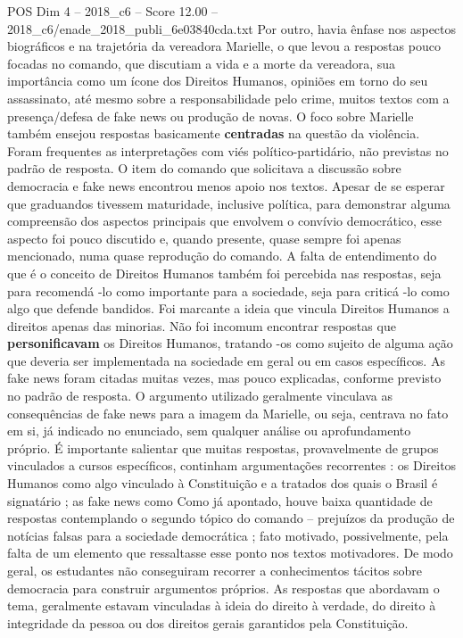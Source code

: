 \begin{textsample}{POS Dim 4 – 2018\_c6 – Score 12.00 – 2018\_c6/enade\_2018\_publi\_6e03840cda.txt}
Por outro, havia ênfase nos aspectos biográficos e na trajetória da vereadora Marielle, o que levou a respostas pouco focadas no comando, que discutiam a vida e a morte da vereadora, sua importância como um ícone dos Direitos Humanos, opiniões em torno do seu assassinato, até mesmo sobre a responsabilidade pelo crime, muitos textos com a presença/defesa de fake news ou produção de novas.
O foco sobre Marielle também ensejou respostas basicamente \textbf{centradas} na questão da violência.
Foram frequentes as interpretações com viés político-partidário, não previstas no padrão de resposta.
O item do comando que solicitava a discussão sobre democracia e fake news encontrou menos apoio nos textos.
Apesar de se esperar que graduandos tivessem maturidade, inclusive política, para demonstrar alguma compreensão dos aspectos principais que envolvem o convívio democrático, esse aspecto foi pouco discutido e, quando presente, quase sempre foi apenas mencionado, numa quase reprodução do comando.
A falta de entendimento do que é o conceito de Direitos Humanos também foi percebida nas respostas, seja para recomendá -lo como importante para a sociedade, seja para criticá -lo como algo que defende bandidos.
Foi marcante a ideia que vincula Direitos Humanos a direitos apenas das minorias.
Não foi incomum encontrar respostas que \textbf{personificavam} os Direitos Humanos, tratando -os como sujeito de alguma ação que deveria ser implementada na sociedade em geral ou em casos específicos.
As fake news foram citadas muitas vezes, mas pouco explicadas, conforme previsto no padrão de resposta.
O argumento utilizado geralmente vinculava as consequências de fake news para a imagem da Marielle, ou seja, centrava no fato em si, já indicado no enunciado, sem qualquer análise ou aprofundamento próprio.
É importante salientar que muitas respostas, provavelmente de grupos vinculados a cursos específicos, continham argumentações recorrentes : os Direitos Humanos como algo vinculado à Constituição e a tratados dos quais o Brasil é signatário ; as fake news como Como já apontado, houve baixa quantidade de respostas contemplando o segundo tópico do comando – prejuízos da produção de notícias falsas para a sociedade democrática ; fato motivado, possivelmente, pela falta de um elemento que ressaltasse esse ponto nos textos motivadores.
De modo geral, os estudantes não conseguiram recorrer a conhecimentos tácitos sobre democracia para construir argumentos próprios.
As respostas que abordavam o tema, geralmente estavam vinculadas à ideia do direito à verdade, do direito à integridade da pessoa ou dos direitos gerais garantidos pela Constituição.

\end{textsample}
